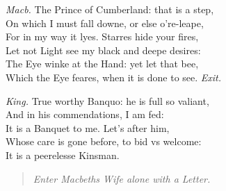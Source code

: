 \documentclass[12pt]{sides}
\newcommand{\StageDir}[1]{\begin{quote}\centering\em #1\end{quote}}
\newcommand{\dia}[1]{\hskip 15pt\textit{#1}\hskip 6pt}
\begin{document}
\begin{multicols}{2}
            \dia{Macb.} The Prince of Cumberland: that is a step, \\ On which I must fall downe, or else o're-leape, \\ For in my way it lyes. Starres hide your fires, \\ Let not Light see my black and deepe desires: \\ The Eye winke at the Hand: yet let that bee, \\ Which the Eye feares, when it is done to see. \hfill \textit{Exit.}

            \dia{King.} True worthy Banquo: he is full so valiant, \\ And in his commendations, I am fed: \\ It is a Banquet to me. Let's after him, \\ Whose care is gone before, to bid vs welcome: \\ It is a peerelesse Kinsman. 
            \StageDir{Enter Macbeths Wife alone with a Letter.}


\end{multicols}
\end{document}
